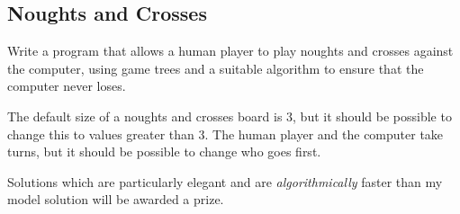 \documentclass[10pt,a4paper]{exam}
\begin{document}
\begin{questions}
\section{Noughts and Crosses}

\question[20] Write a program that allows a human player to play noughts and crosses against the computer, using game trees and a suitable algorithm to ensure that the computer never loses. 

The default size of a noughts and crosses board is 3, but it should be possible to change this to values greater than 3. The human player and the computer take turns, but it should be possible to change who goes first.

Solutions which are particularly elegant and are \emph{algorithmically} faster than my model solution will be awarded a prize. \droppoints 

\end{questions}
\end{document}
